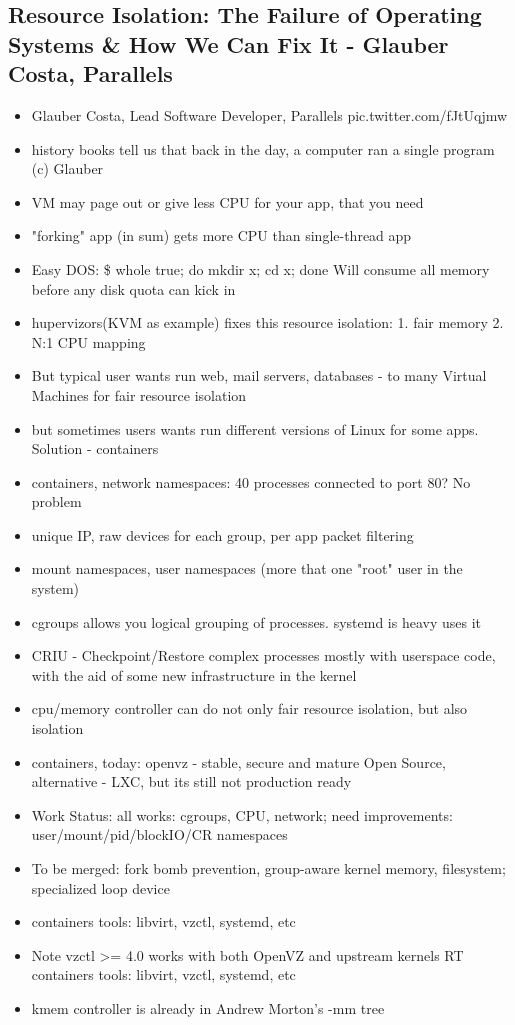 \documentclass[10pt]{article}
\begin{document}
{\subsection{Resource Isolation: The Failure of Operating Systems \& How We Can Fix It - Glauber Costa, Parallels}
\begin{itemize}
\item Glauber Costa, Lead Software Developer, Parallels pic.twitter.com/fJtUqjmw
\item history books tell us that back in the day, a computer ran a single program (c) Glauber
\item VM may page out or give less CPU for your app, that you need
\item "forking" app (in sum) gets more CPU than single-thread app
\item Easy DOS: \$ whole true; do mkdir x; cd x; done Will consume all memory before any disk quota can kick in
\item hupervizors(KVM as example) fixes this resource isolation: 1. fair memory 2. N:1 CPU mapping
\item But typical user wants run web, mail servers, databases - to many Virtual Machines for fair resource isolation
\item but sometimes users wants run different versions of Linux for some apps. Solution - containers
\item containers, network namespaces: 40 processes connected to port 80? No problem
\item unique IP, raw devices for each group, per app packet filtering
\item mount namespaces, user namespaces (more that one "root" user in the system)
\item cgroups allows you logical grouping of processes. systemd is heavy uses it
\item CRIU - Checkpoint/Restore complex processes mostly with userspace code, with the aid of some new infrastructure in the kernel
\item cpu/memory controller can do not only fair resource isolation, but also isolation
\item containers, today: openvz - stable, secure and mature Open Source, alternative - LXC, but its still not production ready
\item Work Status: all works: cgroups, CPU, network; need improvements: user/mount/pid/blockIO/CR namespaces
\item To be merged: fork bomb prevention, group-aware kernel memory, filesystem; specialized loop device
\item containers tools: libvirt, vzctl, systemd, etc
\item Note vzctl >= 4.0 works with both OpenVZ and upstream kernels RT containers tools: libvirt, vzctl, systemd, etc
\item kmem controller is already in Andrew Morton's -mm tree
\end{itemize}

}
\end{document}

